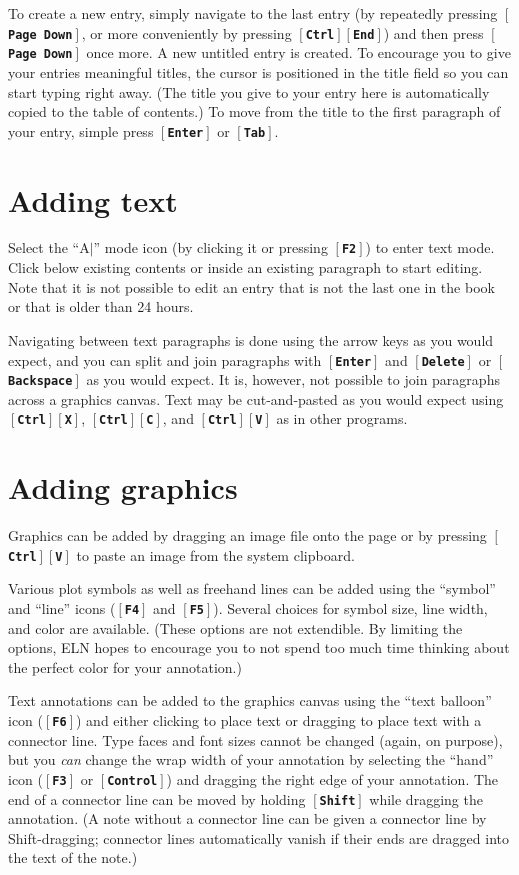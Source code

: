 \documentclass[11pt]{report}
\def\keystroke#1{$\left[\right.\!${\tt\bfseries #1}$\!\left.\right]$}
\def\key#1{\keystroke{#1}}
\def\keycombo#1#2{\keystroke{#1}\keystroke{#2}}
\def\keycontrol#1{\keycombo{Ctrl}{#1}}
\begin{document}
To create a new entry, simply navigate to the last entry (by
repeatedly pressing \key{Page Down}, or more conveniently by pressing
\keycontrol{End}) and then press \key{Page Down} once more. A new
untitled entry is created. To encourage you to give your entries
meaningful titles, the cursor is positioned in the title field so you
can start typing right away. (The title you give to your entry here is
automatically copied to the table of contents.) To move from the title
to the first paragraph of your entry, simple press \key{Enter} or \key{Tab}.

\section{Adding text}

Select the ``A\hbox{$|$}'' mode icon (by clicking it or
pressing \key{F2}) to enter text mode. Click below existing contents or
inside an existing paragraph to start editing. Note that it is not
possible to edit an entry that is not the last one in the book or that
is older than 24 hours.

Navigating between text paragraphs is done using the arrow keys as you
would expect, and you can split and join paragraphs with \key{Enter} and
\key{Delete} or \key{Backspace} as you would expect. It is, however, not
possible to join paragraphs across a graphics canvas. Text may be
cut-and-pasted as you would expect using \keycontrol{X},
\keycontrol{C}, and \keycontrol{V} as in other programs. 

\section{Adding graphics}

Graphics can be added by dragging an image file onto the page or by
pressing \keycontrol{V} to paste an image from the system
clipboard. 

Various plot symbols as well as freehand lines can be added using the
``symbol'' and ``line'' icons (\key{F4} and \key{F5}). Several choices for
symbol size, line width, and color are available.  (These options
are not extendible. By limiting the options,
ELN hopes to encourage you to not spend too much time thinking about
the perfect color for your annotation.)

Text annotations can be added to the graphics canvas using the ``text
balloon'' icon (\key{F6}) and either clicking to place text or dragging
to place text with a connector line. Type faces and font sizes cannot
be changed (again, on purpose), but you \emph{can} change the wrap width of
your annotation by selecting the ``hand'' icon (\key{F3} or \key{Control}) and
dragging the right edge of your annotation. The end of a connector
line can be moved by holding \key{Shift} while dragging the
annotation. (A note without a connector line can be given a connector
line by Shift-dragging; connector lines automatically vanish if their ends
are dragged into the text of the note.)
\end{document}
